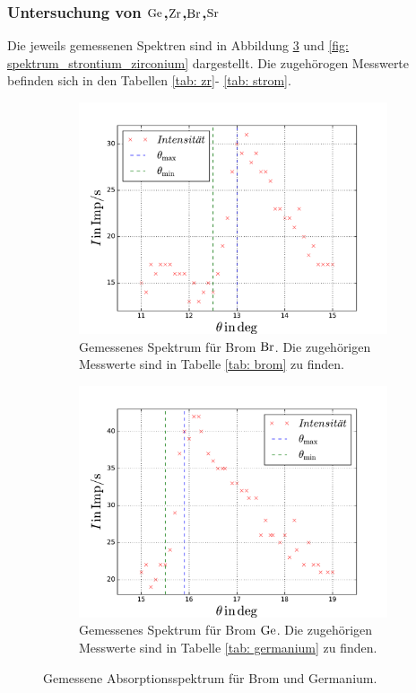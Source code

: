 \subsubsection{Untersuchung von $\ce{Ge}$,$\ce{Zr}$,$\ce{Br}$,$\ce{Sr}$}
Die jeweils gemessenen Spektren sind in Abbildung \ref{fig: spektrum_brom_germanium} und
\ref{fig: spektrum_strontium_zirconium} dargestellt. Die zugehörogen Messwerte befinden sich in den Tabellen \ref{tab: zr}- \ref{tab: strom}.
\begin{figure}
  \centering
  \begin{subfigure}{0.48\textwidth}
    \centering
    \includegraphics[width=1 \textwidth]{../Messdaten/brom.pdf}
    \caption{Gemessenes Spektrum für Brom $\ce{Br}$. Die zugehörigen Messwerte sind in Tabelle \ref{tab: brom} zu finden.} %
    \label{fig: brom_spektrum}
  \end{subfigure}
  \begin{subfigure}{0.48\textwidth}
    \centering
    \includegraphics[width=1 \textwidth]{../Messdaten/germanium.pdf}
    \caption{Gemessenes Spektrum für Brom $\ce{Ge}$. Die zugehörigen Messwerte sind in Tabelle \ref{tab: germanium} zu finden.} %
    \label{fig: germaium_spektrum}
  \end{subfigure}
  \caption{Gemessene Absorptionsspektrum für Brom und Germanium.}
  \label{fig: spektrum_brom_germanium}
\end{figure}
